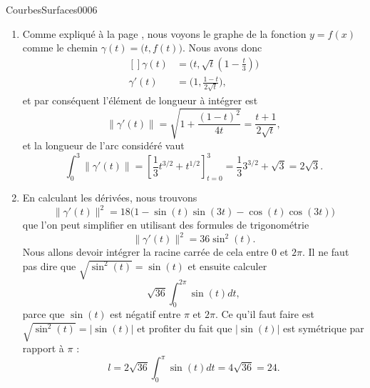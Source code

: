 \begin{corrige}{CourbesSurfaces0006}

	\begin{enumerate}
		\item
			Comme expliqué à la page \pageref{PgGrqFnGamma}, nous voyons le graphe de la fonction $y=f(x)$ comme le chemin $\gamma(t)=\big( t,f(t) \big)$. Nous avons donc
			\begin{equation}
					\begin{aligned}[]
					\gamma(t)&=\big( t,\sqrt{t}(1-\frac{ t }{ 3 }) \big)\\
					\gamma'(t)&=\big( 1,\frac{ 1-t }{ 2\sqrt{t} } \big),
				\end{aligned}
			\end{equation}
			et par conséquent l'élément de longueur à intégrer est
			\begin{equation}
				\| \gamma'(t) \|=\sqrt{1+\frac{ (1-t)^2 }{ 4t }}=\frac{ t+1 }{ 2\sqrt{t} },
			\end{equation}
			et la longueur de l'arc considéré vaut
			\begin{equation}
				\int_0^3\| \gamma'(t) \|=\left[ \frac{1}{ 3 }t^{3/2}+t^{1/2} \right]_{t=0}^{3}=\frac{1}{ 3 }3^{3/2}+\sqrt{3}=2\sqrt{3}.
			\end{equation}
		
		\item
			En calculant les dérivées, nous trouvons
			\begin{equation}
				\| \gamma'(t) \|^2=18\big( 1-\sin(t)\sin(3t)-\cos(t)\cos(3t) \big)
			\end{equation}
			que l'on peut simplifier en utilisant des formules de trigonométrie%
			\begin{equation}
				\| \gamma'(t) \|^2=36\sin^2(t).
			\end{equation}
			Nous allons devoir intégrer la racine carrée de cela entre $0$ et $2\pi$. Il ne faut pas dire que $\sqrt{\sin^2(t)}=\sin(t)$ et ensuite calculer
			\begin{equation}
				\sqrt{36}\int_0^{2\pi}\sin(t)dt,
			\end{equation}
			parce que $\sin(t)$ est négatif entre $\pi$ et $2\pi$. Ce qu'il faut faire est $\sqrt{\sin^2(t)}=| \sin(t) |$ et profiter du fait que $|\sin(t)|$ est symétrique par rapport à $\pi$ :
			\begin{equation}
				l=2\sqrt{36}\int_0^{\pi}\sin(t)dt=4\sqrt{36}=24.
			\end{equation}


	\end{enumerate}

\end{corrige}
